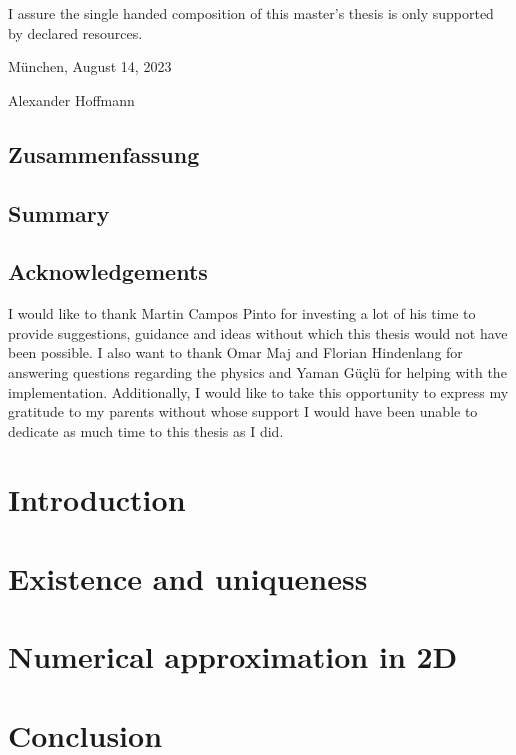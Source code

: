 \documentclass[12pt,a4paper,times]{report}
\numberwithin{equation}{section}
\numberwithin{figure}{section}
\numberwithin{lemma}{section}
\theoremstyle{definition}
\begin{document}
\noindent I assure the single handed composition of this master's thesis is only supported by declared resources.
\bigskip

\noindent München, August 14, 2023 \par
\vspace{2,5cm}
 
\noindent\hspace{1cm} Alexander Hoffmann
    \vspace{1cm}
\newpage
\thispagestyle{empty}
\section*{Zusammenfassung}

\vspace{1cm}
\section*{Summary}

\newpage

\thispagestyle{empty}
\section*{Acknowledgements}
I would like to thank Martin Campos Pinto for investing a lot of his time 
to provide suggestions, guidance and ideas without which this thesis would not have 
been possible. I also want to thank Omar Maj and Florian Hindenlang for answering questions regarding the physics 
and Yaman Güçlü for helping with the implementation. Additionally, I would like to take 
this opportunity to express my gratitude to my parents without whose support I would have 
been unable to dedicate as much time to this thesis as I did.
\newpage

\tableofcontents
\newpage
{}
\setcounter{page}{1}

\chapter*{Introduction}\label{chap:introduction}

\chapter{Existence and uniqueness}\label{chap:existence_and_uniqueness}

\chapter{Numerical approximation in 2D}\label{chap:approximation_in_2D}

\chapter*{Conclusion}\label{chap:conclusion}

\printbibliography
\end{document}
